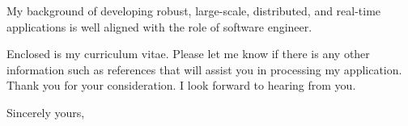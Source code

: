 \documentclass[12pt]{letter} %
\newcommand{\company}{Bloomberg}
\begin{document}
\begin{letter}
My background of 
developing 
robust, large-scale, distributed, and real-time
applications 
is well aligned with the role of software engineer.
 
Enclosed is my curriculum vitae. Please let me know if there is any other information such as references that will assist you in processing my application. Thank you for your consideration. I look forward to hearing from you.

\closing{Sincerely yours,}


\end{letter}
\end{document}
